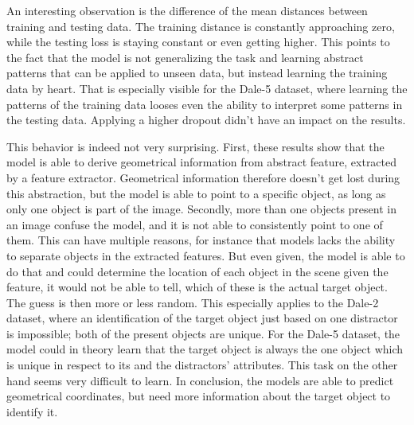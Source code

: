 An interesting observation is the difference of the mean distances between training and testing data.
The training distance is constantly approaching zero, while the testing loss is staying constant or even getting higher.
This points to the fact that the model is not generalizing the task and learning abstract patterns that can be applied to unseen data, but instead learning the training data by heart.
That is especially visible for the Dale-5 dataset, where learning the patterns of the training data looses even the ability to interpret some patterns in the testing data.
Applying a higher dropout didn't have an impact on the results.

This behavior is indeed not very surprising.
First, these results show that the model is able to derive geometrical information from abstract feature, extracted by a feature extractor.
Geometrical information therefore doesn't get lost during this abstraction, but the model is able to point to a specific object, as long as only one object is part of the image.
Secondly, more than one objects present in an image confuse the model, and it is not able to consistently point to one of them.
This can have multiple reasons, for instance that models lacks the ability to separate objects in the extracted features.
But even given, the model is able to do that and could determine the location of each object in the scene given the feature, it would not be able to tell, which of these is the actual target object.
The guess is then more or less random.
This especially applies to the Dale-2 dataset, where an identification of the target object just based on one distractor is impossible; both of the present objects are unique.
For the Dale-5 dataset, the model could in theory learn that the target object is always the one object which is unique in respect to its and the distractors' attributes.
This task on the other hand seems very difficult to learn.
In conclusion, the models are able to predict geometrical coordinates, but need more information about the target object to identify it.

